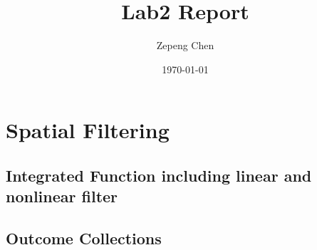 \documentclass[14pt]{article}
\title{Lab2 Report}
\author{Zepeng Chen}
\date{\today}
\begin{document}
	\maketitle
	\tableofcontents
	\section{Spatial Filtering}
	\subsection{Integrated Function including linear and nonlinear filter}
	
	\newcommand{\RNum}[1]{\uppercase\expandafter{\romannumeral #1\relax}}
	\subsection{Outcome Collections \RNum{1}}
	\newpage
\end{document}
